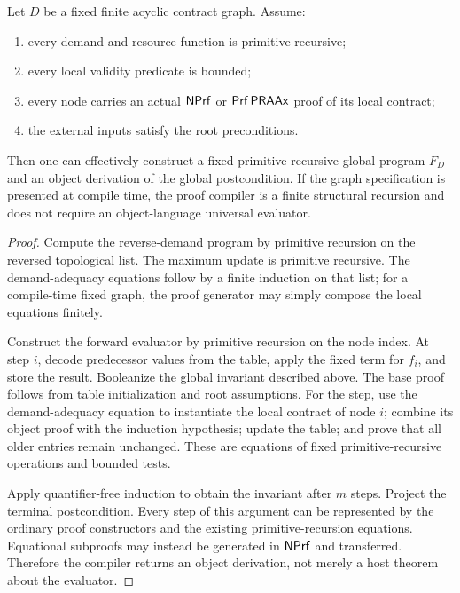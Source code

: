 \begin{theorem}\label{thm:dag}
Let \(D\) be a fixed finite acyclic contract graph.  Assume:

\begin{enumerate}
  \item every demand and resource function is primitive recursive;
  \item every local validity predicate is bounded;
  \item every node carries an actual \(\mathsf{NPrf}\) or \(\mathsf{Prf}\,\mathsf{PRAAx}\) proof of its local contract;
  \item the external inputs satisfy the root preconditions.
\end{enumerate}

Then one can effectively construct a fixed primitive-recursive global program \(F_D\) and an object derivation of the global postcondition.  If the graph specification is presented at compile time, the proof compiler is a finite structural recursion and does not require an object-language universal evaluator.
\end{theorem}

\begin{proof}
Compute the reverse-demand program by primitive recursion on the reversed topological list.  The maximum update is primitive recursive.  The demand-adequacy equations follow by a finite induction on that list; for a compile-time fixed graph, the proof generator may simply compose the local equations finitely.

Construct the forward evaluator by primitive recursion on the node index.  At step \(i\), decode predecessor values from the table, apply the fixed term for \(f_i\), and store the result.  Booleanize the global invariant described above.  The base proof follows from table initialization and root assumptions.  For the step, use the demand-adequacy equation to instantiate the local contract of node \(i\); combine its object proof with the induction hypothesis; update the table; and prove that all older entries remain unchanged.  These are equations of fixed primitive-recursive operations and bounded tests.

Apply quantifier-free induction to obtain the invariant after \(m\) steps.  Project the terminal postcondition.  Every step of this argument can be represented by the ordinary proof constructors and the existing primitive-recursion equations.  Equational subproofs may instead be generated in \(\mathsf{NPrf}\) and transferred.  Therefore the compiler returns an object derivation, not merely a host theorem about the evaluator.
\end{proof}

